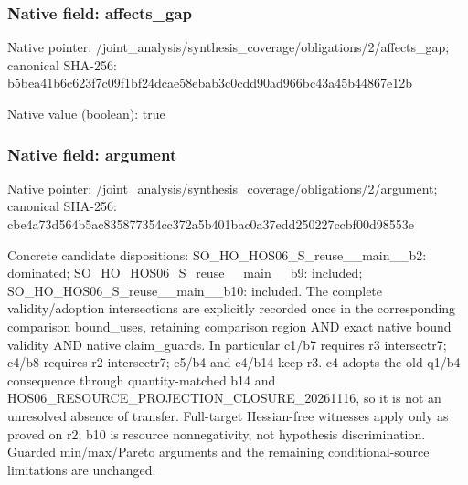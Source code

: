 \documentclass[10pt,a4paper]{article}
\begin{document}
\subsubsection{Native field: affects\_\allowbreak{}gap}
Native pointer: /joint\_\allowbreak{}analysis/synthesis\_\allowbreak{}coverage/obligations/2/affects\_\allowbreak{}gap; canonical SHA-256: b5bea41b6c623f7c09f1bf24dcae58ebab3c0cdd90ad966bc43a45b44867e12b

Native value (boolean): true

\subsubsection{Native field: argument}
Native pointer: /joint\_\allowbreak{}analysis/synthesis\_\allowbreak{}coverage/obligations/2/argument; canonical SHA-256: cbe4a73d564b5ac835877354cc372a5b401bac0a37edd250227ccbf00d98553e

\begingroup\raggedright\sloppy Concrete candidate dispositions:\allowbreak{} SO\_\allowbreak{}HO\_\allowbreak{}HOS06\_\allowbreak{}S\_\allowbreak{}reuse\_\allowbreak{}\_\allowbreak{}main\_\allowbreak{}\_\allowbreak{}b2:\allowbreak{} dominated;\allowbreak{} SO\_\allowbreak{}HO\_\allowbreak{}HOS06\_\allowbreak{}S\_\allowbreak{}reuse\_\allowbreak{}\_\allowbreak{}main\_\allowbreak{}\_\allowbreak{}b9:\allowbreak{} included;\allowbreak{} SO\_\allowbreak{}HO\_\allowbreak{}HOS06\_\allowbreak{}S\_\allowbreak{}reuse\_\allowbreak{}\_\allowbreak{}main\_\allowbreak{}\_\allowbreak{}b10:\allowbreak{} included. The complete validity/\allowbreak{}adoption intersections are explicitly recorded once in the corresponding comparison bound\_\allowbreak{}uses,\allowbreak{} retaining comparison region AND exact native bound validity AND native claim\_\allowbreak{}guards. In particular c1/\allowbreak{}b7 requires r3 intersectr7;\allowbreak{} c4/\allowbreak{}b8 requires r2 intersectr7;\allowbreak{} c5/\allowbreak{}b4 and c4/\allowbreak{}b14 keep r3. c4 adopts the old q1/\allowbreak{}b4 consequence through quantity-matched b14 and HOS06\_\allowbreak{}RESOURCE\_\allowbreak{}PROJECTION\_\allowbreak{}CLOSURE\_\allowbreak{}20261116,\allowbreak{} so it is not an unresolved absence of transfer. Full-target Hessian-free witnesses apply only as proved on r2;\allowbreak{} b10 is resource nonnegativity,\allowbreak{} not hypothesis discrimination. Guarded min/\allowbreak{}max/\allowbreak{}Pareto arguments and the remaining conditional-source limitations are unchanged.\par\endgroup
\end{document}
